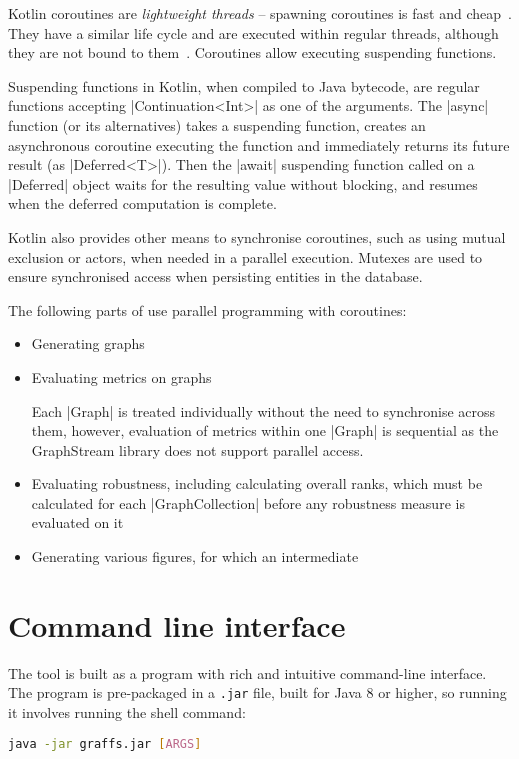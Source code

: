 Kotlin coroutines are \textsl{lightweight threads} -- spawning coroutines is fast and cheap~\cite{AriasFunctionalKotlinExtend2018}.
They have a similar life cycle and are executed within regular threads, although they are not bound to them~\cite{TorresLearningConcurrencyKotlin2018}.
Coroutines allow executing suspending functions.

Suspending functions in Kotlin, when compiled to Java bytecode, are regular functions accepting |Continuation<Int>| as one of the arguments.
The |async| function (or its alternatives) takes a suspending function, creates an asynchronous coroutine executing the function and immediately returns its future result (as |Deferred<T>|).
Then the |await| suspending function called on a |Deferred| object waits for the resulting value without blocking, and resumes when the deferred computation is complete.

Kotlin also provides other means to synchronise coroutines, such as using mutual exclusion or actors, when needed in a parallel execution.
Mutexes are used to ensure synchronised access when persisting entities in the database.


The following parts of \graffs use parallel programming with coroutines:
\begin{itemize}[topsep=5pt]
    \item Generating graphs
    \item Evaluating metrics on graphs

    Each |Graph| is treated individually without the need to synchronise across them, however, evaluation of metrics within one |Graph| is sequential as the GraphStream library does not support parallel access.
    \item Evaluating robustness, including calculating overall ranks, which must be calculated for each |GraphCollection| before any robustness measure is evaluated on it
    \item Generating various figures, for which an intermediate
\end{itemize}


\section{Command line interface}\label{sec:cli}

The \graffs tool is built as a program with rich and intuitive command-line interface.
The program is pre-packaged in a \texttt{.jar} file, built for Java 8 or higher, so running it involves running the shell command:
\begin{lstlisting}[language=bash,style=light]
java -jar graffs.jar [ARGS]
\end{lstlisting}

